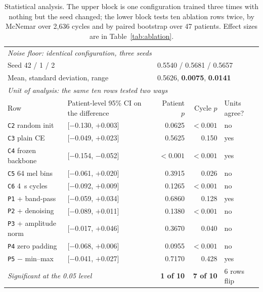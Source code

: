 \documentclass[journal,onecolumn]{IEEEtran}
\newcommand{\best}[1]{\textbf{#1}}
\begin{document}
\begin{table}[!t]
\centering
\caption{Statistical analysis. The upper block is one configuration trained three times with
nothing but the seed changed; the lower block tests ten ablation rows twice, by McNemar over
2,636 cycles and by paired bootstrap over 47 patients. Effect sizes are in
Table~\ref{tab:ablation}.}
\label{tab:stats}
\footnotesize
\begin{tabular}{llrrl}
\toprule
\multicolumn{5}{l}{\emph{Noise floor: identical configuration, three seeds}}\\
\multicolumn{2}{l}{Seed 42 / 1 / 2} & \multicolumn{3}{l}{0.5540 / 0.5681 / 0.5657} \\
\multicolumn{2}{l}{Mean, standard deviation, range} & \multicolumn{3}{l}{0.5626, \best{0.0075}, \best{0.0141}} \\
\midrule
\multicolumn{5}{l}{\emph{Unit of analysis: the same ten rows tested two ways}}\\
Row & Patient-level 95\% CI on the difference & Patient $p$ & Cycle $p$ & Units agree? \\
\midrule
\texttt{C2} random init      & [$-$0.130, $+$0.003] & 0.0625 & $<0.001$ & no \\
\texttt{C3} plain CE         & [$-$0.049, $+$0.023] & 0.5625 & 0.150 & yes \\
\texttt{C4} frozen backbone  & [$-$0.154, $-$0.052] & \best{$<0.001$} & $<0.001$ & yes \\
\texttt{C5} 64 mel bins      & [$-$0.061, $+$0.020] & 0.3915 & 0.026 & no \\
\texttt{C6} 4~s cycles       & [$-$0.092, $+$0.009] & 0.1265 & $<0.001$ & no \\
\texttt{P1} + band-pass      & [$-$0.059, $+$0.034] & 0.6860 & 0.128 & yes \\
\texttt{P2} + denoising      & [$-$0.089, $+$0.011] & 0.1380 & $<0.001$ & no \\
\texttt{P3} + amplitude norm & [$-$0.017, $+$0.046] & 0.3670 & 0.040 & no \\
\texttt{P4} zero padding     & [$-$0.068, $+$0.006] & 0.0955 & $<0.001$ & no \\
\texttt{P5} $-$ min--max     & [$-$0.041, $+$0.027] & 0.7170 & 0.428 & yes \\
\midrule
\multicolumn{2}{l}{\emph{Significant at the 0.05 level}} & \best{1 of 10} & \best{7 of 10} & 6 rows flip \\
\bottomrule
\end{tabular}
\end{table}
\end{document}

